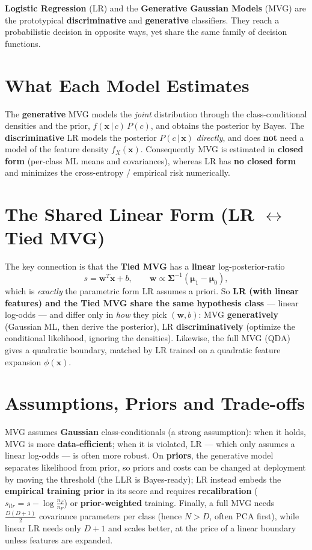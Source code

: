 \textbf{Logistic Regression} (LR) and the \textbf{Generative Gaussian Models} (MVG) are the prototypical \textbf{discriminative} and \textbf{generative} classifiers. They reach a probabilistic decision in opposite ways, yet share the same family of decision functions.

\section*{What Each Model Estimates}

The \textbf{generative} MVG models the \emph{joint} distribution through the class-conditional densities and the prior, $f(\mathbf{x}\,|\,c)\,P(c)$, and obtains the posterior by Bayes. The \textbf{discriminative} LR models the posterior $P(c\,|\,\mathbf{x})$ \emph{directly}, and does \textbf{not} need a model of the feature density $f_X(\mathbf{x})$. Consequently MVG is estimated in \textbf{closed form} (per-class ML means and covariances), whereas LR has \textbf{no closed form} and minimizes the cross-entropy / empirical risk numerically.

\section*{The Shared Linear Form (LR $\leftrightarrow$ Tied MVG)}

The key connection is that the \textbf{Tied MVG} has a \textbf{linear} log-posterior-ratio
\[
s=\mathbf{w}^T\mathbf{x}+b,\qquad \mathbf{w}\propto\boldsymbol{\Sigma}^{-1}(\boldsymbol{\mu}_1-\boldsymbol{\mu}_0),
\]
which is \emph{exactly} the parametric form LR assumes a priori. So \textbf{LR (with linear features) and the Tied MVG share the same hypothesis class} --- linear log-odds --- and differ only in \emph{how} they pick $(\mathbf{w},b)$: MVG \textbf{generatively} (Gaussian ML, then derive the posterior), LR \textbf{discriminatively} (optimize the conditional likelihood, ignoring the densities). Likewise, the full MVG (QDA) gives a quadratic boundary, matched by LR trained on a quadratic feature expansion $\phi(\mathbf{x})$.

\section*{Assumptions, Priors and Trade-offs}

MVG assumes \textbf{Gaussian} class-conditionals (a strong assumption): when it holds, MVG is more \textbf{data-efficient}; when it is violated, LR --- which only assumes a linear log-odds --- is often more robust. On \textbf{priors}, the generative model separates likelihood from prior, so priors and costs can be changed at deployment by moving the threshold (the LLR is Bayes-ready); LR instead embeds the \textbf{empirical training prior} in its score and requires \textbf{recalibration} ($s_{llr}=s-\log\frac{n_T}{n_F}$) or \textbf{prior-weighted} training. Finally, a full MVG needs $\tfrac{D(D+1)}{2}$ covariance parameters per class (hence $N>D$, often PCA first), while linear LR needs only $D+1$ and scales better, at the price of a linear boundary unless features are expanded.

